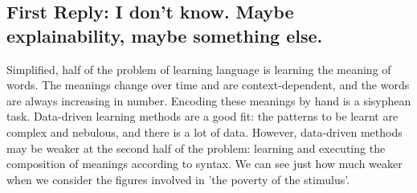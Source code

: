 \begin{fullwidth}
\begin{multicols}{2}
\section{\textbf{First Reply:} I don't know. Maybe explainability, maybe something else.}


Simplified, half of the problem of learning language is learning the meaning of words. The meanings change over time and are context-dependent, and the words are always increasing in number. Encoding these meanings by hand is a sisyphean task. Data-driven learning methods are a good fit: the patterns to be learnt are complex and nebulous, and there is a lot of data. However, data-driven methods may be weaker at the second half of the problem: learning and executing the composition of meanings according to syntax. We can see just how much weaker when we consider the figures involved in 'the poverty of the stimulus'.\\


\end{multicols}
\end{fullwidth}

